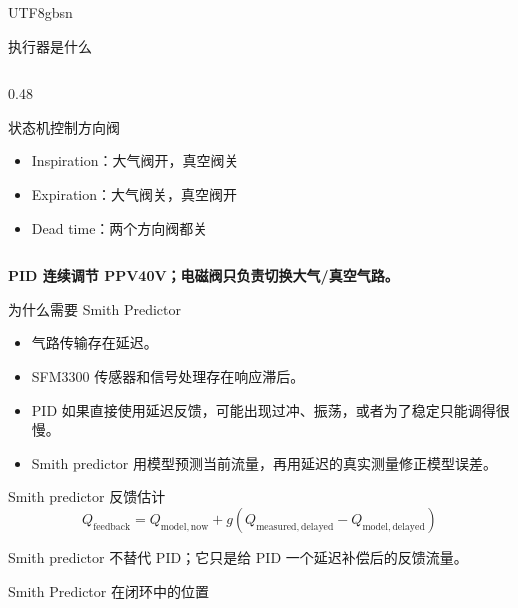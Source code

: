 \documentclass[aspectratio=169,10pt]{beamer}
\newcommand{\highlight}[1]{\textcolor{lungblue}{\textbf{#1}}}
\begin{document}
\begin{CJK*}{UTF8}{gbsn}
\begin{frame}{执行器是什么}
\begin{columns}[T,onlytextwidth]
\begin{column}{0.48\textwidth}
      \begin{block}{状态机控制方向阀}
        \begin{itemize}
          \item Inspiration：大气阀开，真空阀关
          \item Expiration：大气阀关，真空阀开
          \item Dead time：两个方向阀都关
        \end{itemize}
      \end{block}
    \end{column}
  \end{columns}

  \vspace{0.2em}
  \centering
  \highlight{PID 连续调节 PPV40V；电磁阀只负责切换大气/真空气路。}
\end{frame}

\begin{frame}{为什么需要 Smith Predictor}
  \begin{itemize}
    \item 气路传输存在延迟。
    \item SFM3300 传感器和信号处理存在响应滞后。
    \item PID 如果直接使用延迟反馈，可能出现过冲、振荡，或者为了稳定只能调得很慢。
    \item Smith predictor 用模型预测当前流量，再用延迟的真实测量修正模型误差。
  \end{itemize}

  \vspace{0.6em}
  \begin{block}{Smith predictor 反馈估计}
    \[
      Q_{\mathrm{feedback}}
      =
      Q_{\mathrm{model,now}}
      +
      g\left(
      Q_{\mathrm{measured,delayed}}
      -
      Q_{\mathrm{model,delayed}}
      \right)
    \]
  \end{block}

  \vspace{0.2em}
  \centering
  Smith predictor 不替代 PID；它只是给 PID 一个延迟补偿后的反馈流量。
\end{frame}

\begin{frame}{Smith Predictor 在闭环中的位置}
  \centering
\end{frame}
\end{CJK*}
\end{document}
